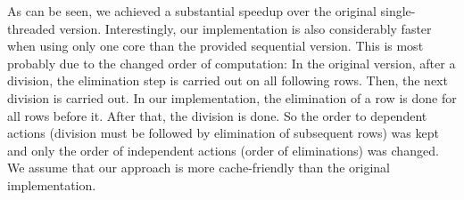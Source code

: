 \documentclass[]{article}
\begin{document}
As can be seen, we achieved a substantial speedup over the original single-threaded version.
Interestingly, our implementation is also considerably faster when using only one core than the provided sequential version.
This is most probably due to the changed order of computation: In the original version, after a division, the elimination step is carried out on all following rows. Then, the next division is carried out. In our implementation, the elimination of a row is done for all rows before it. After that, the division is done. So the order to dependent actions (division must be followed by elimination of subsequent rows) was kept and only the order of independent actions (order of eliminations) was changed.
We assume that our approach is more cache-friendly than the original implementation.

\FloatBarrier
\clearpage
\newpage

\begin{appendices}
\end{appendices}
\end{document}
